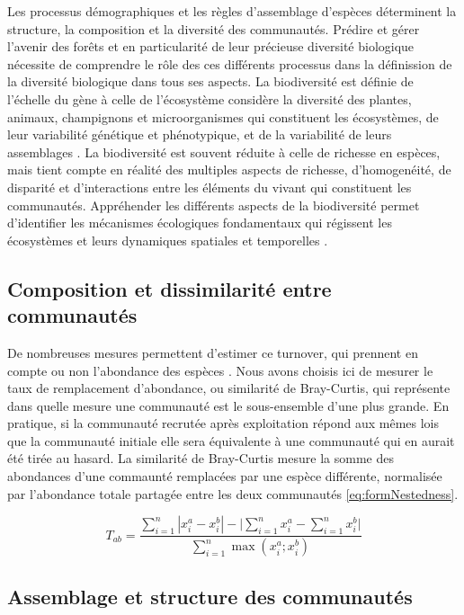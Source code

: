 \documentclass[
  11pt,
  french,
  A4paper,
  extrafontsizes,onecolumn,openright
  ]{memoir}
\begin{document}
Les processus démographiques et les règles d'assemblage d'espèces
déterminent la structure, la composition et la diversité des
communautés. Prédire et gérer l'avenir des forêts et en particularité de
leur précieuse diversité biologique nécessite de comprendre le rôle des
ces différents processus dans la définission de la diversité biologique
dans tous ses aspects. La biodiversité est définie de l'échelle du gène
à celle de l'écosystème considère la diversité des plantes, animaux,
champignons et microorganismes qui constituent les écosystèmes, de leur
variabilité génétique et phénotypique, et de la variabilité de leurs
assemblages \autocite{Loreau2005}. La biodiversité est souvent réduite à
celle de richesse en espèces, mais tient compte en réalité des multiples
aspects de richesse, d'homogenéité, de disparité et d'interactions entre
les éléments du vivant qui constituent les communautés. Appréhender les
différents aspects de la biodiversité permet d'identifier les mécanismes
écologiques fondamentaux qui régissent les écosystèmes et leurs
dynamiques spatiales et temporelles \autocites{Purvis2000}{Loreau2005}.

\subsection{Composition et dissimilarité entre
communautés}\label{composition-et-dissimilarite-entre-communautes}

De nombreuses mesures permettent d'estimer ce turnover, qui prennent en
compte ou non l'abondance des espèces \autocite{Podani2013}. Nous avons
choisis ici de mesurer le taux de remplacement d'abondance, ou
similarité de Bray-Curtis, qui représente dans quelle mesure une
communauté est le sous-ensemble d'une plus grande. En pratique, si la
communauté recrutée après exploitation répond aux mêmes lois que la
communauté initiale elle sera équivalente à une communauté qui en aurait
été tirée au hasard. La similarité de Bray-Curtis mesure la somme des
abondances d'une commaunté remplacées par une espèce différente,
normalisée par l'abondance totale partagée entre les deux communautés
\eqref{eq:formNestedness}.

\begin{equation}
T_{ab}=\frac{\sum_{i=1}^{n}|x_i^a - x_i^b| - \bigg| \sum_{i=1}^{n}{x_i^a} - \sum_{i=1}^{n}{x_i^b} \bigg|}{\sum_{i=1}^{n}\max{\left( x_i^a;x_i^b \right)}}
\label{eq:formNestedness}
\end{equation}

\subsection{Assemblage et structure des
communautés}\label{AbundanceDistribution}
\end{document}
